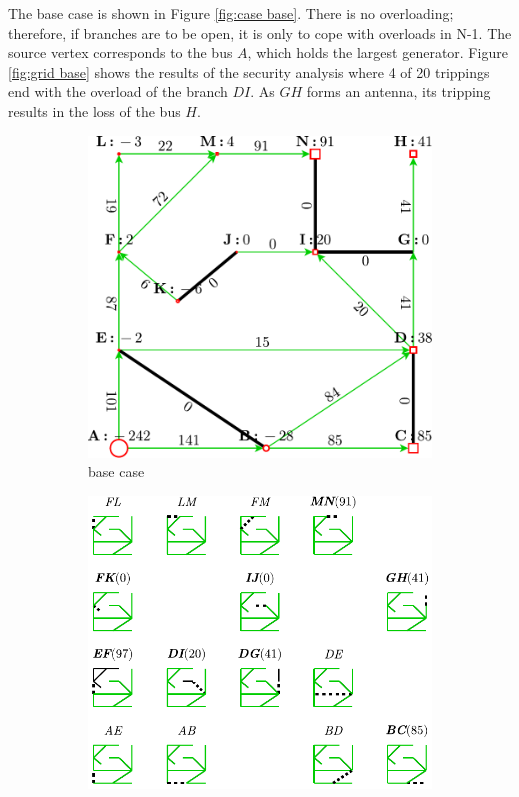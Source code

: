 The base case is shown in Figure \ref{fig:case base}. There is no overloading; therefore,
if branches are to be open, it is only to cope with overloads in N-1. The source
vertex corresponds to the bus $A$, which holds the largest generator. Figure \ref{fig:grid
base} shows the results of the security analysis where 4 of 20 trippings end with
the overload of the branch $DI$. As $GH$ forms an antenna, its tripping results in
the loss of the bus $H$.

\begin{figure}
    \begin{subfigure}
        [t]{.43\linewidth}
        \includegraphics[width=\linewidth]{images/case_ots.pdf}
        \caption{base case}
        \label{fig:case ots}
    \end{subfigure}\hfill
    \begin{subfigure}
        [t]{.48\linewidth}
        \includegraphics[width=\linewidth]{images/grid_ots.pdf}

\end{subfigure}
\end{figure}
